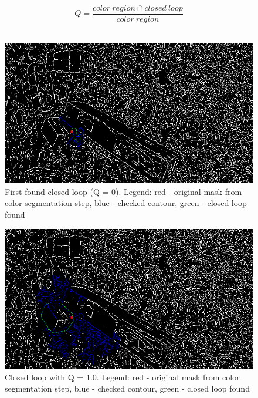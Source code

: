 \documentclass{ctuthesis}
\begin{document}
\[ Q = \frac{color\ region \cap closed\ loop}{color\ region} \]
\\

\begin{figure}[htbp]
    \centering
    \includegraphics[width=\textwidth]{quality0.png}
    \caption{First found closed loop (Q = 0). Legend: red - original mask from color segmentation step, blue - checked contour, green - closed loop found}
    \label{fig:q0-cl}
\end{figure}


\begin{figure}[htbp]
    \centering
    \includegraphics[width=\textwidth]{quality100.png}
    \caption{Closed loop with Q = 1.0. Legend: red - original mask from color segmentation step, blue - checked contour, green - closed loop found}
    \label{fig:q100-cl}
\end{figure}
\end{document}
